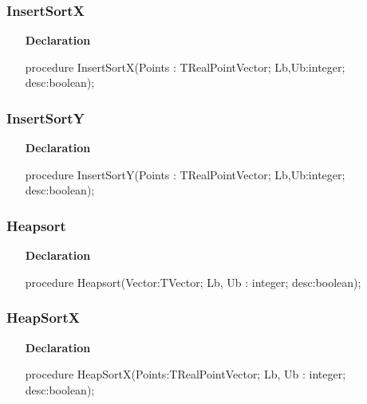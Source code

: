 \documentclass[12pt,a4paper,oneside]{report}
\newcommand{\declarationitem}[1]{\textbf{#1}}
\begin{document}
\subsubsection{InsertSortX}
\label{lmsorting-InsertSortX}
\begin{itemize}\item[\declarationitem{Declaration}\hfill]
	\begin{flushleft}
		\begin{ttfamily}
			procedure InsertSortX(Points : TRealPointVector; Lb,Ub:integer; desc:boolean);\end{ttfamily}
		
	\end{flushleft}
	
\end{itemize}
\subsubsection{InsertSortY}
\label{lmsorting-InsertSortY}
\begin{itemize}\item[\declarationitem{Declaration}\hfill]
	\begin{flushleft}
		\begin{ttfamily}
			procedure InsertSortY(Points : TRealPointVector; Lb,Ub:integer; desc:boolean);\end{ttfamily}
		
	\end{flushleft}
	
\end{itemize}
\subsubsection{Heapsort}
\label{lmsorting-Heapsort}
\begin{itemize}\item[\declarationitem{Declaration}\hfill]
	\begin{flushleft}
		\begin{ttfamily}
			procedure Heapsort(Vector:TVector; Lb, Ub : integer; desc:boolean);\end{ttfamily}
		
	\end{flushleft}
	
\end{itemize}
\subsubsection{HeapSortX}
\label{lmsorting-HeapSortX}
\begin{itemize}\item[\declarationitem{Declaration}\hfill]
	\begin{flushleft}
		\begin{ttfamily}
			procedure HeapSortX(Points:TRealPointVector; Lb, Ub : integer; desc:boolean);\end{ttfamily}
		
	\end{flushleft}
	
\end{itemize}
\end{document}
